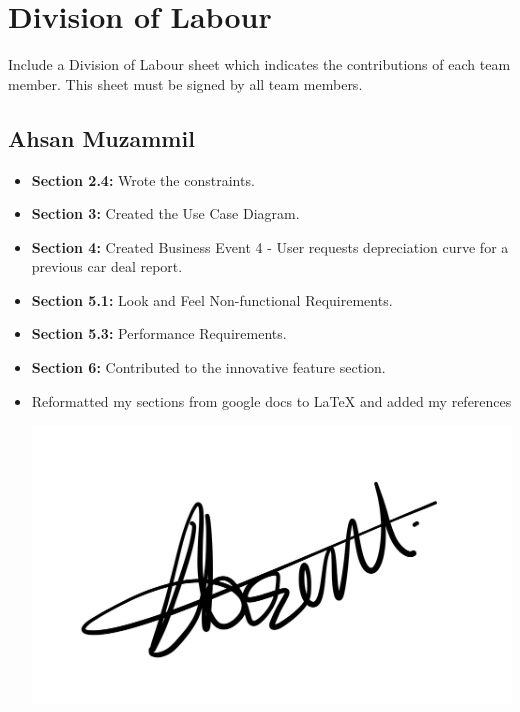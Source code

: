 \documentclass[]{article}
\begin{document}
\appendix
\section{Division of Labour}
\label{sec:division_of_labour}
Include a Division of Labour sheet which indicates the contributions of each team member. This sheet must be signed by all team members.

\subsection{Ahsan Muzammil}
\begin{itemize}
    \item \textbf{Section 2.4:} Wrote the constraints.
    \item \textbf{Section 3:} Created the Use Case Diagram.
    \item \textbf{Section 4:} Created Business Event 4 - User requests depreciation curve for a previous car deal report.
    \item \textbf{Section 5.1:} Look and Feel Non-functional Requirements.
    \item \textbf{Section 5.3:} Performance Requirements.
    \item \textbf{Section 6:} Contributed to the innovative feature section.
    \item Reformatted my sections from google docs to LaTeX and added my references
    \begin{center}
        \includegraphics[scale=0.1]{Images/ahsan.jpeg}
    \end{center}
\end{itemize}
\end{document}
